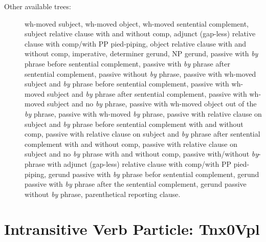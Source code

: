 \begin{description}
\item[Other available trees:] wh-moved subject, wh-moved object, wh-moved 
sentential complement, subject relative clause with and without comp, 
adjunct (gap-less) relative clause with comp/with PP pied-piping, 
object relative clause with and without comp, 
imperative, determiner gerund, NP gerund, passive with {\it by} phrase 
before sentential complement, passive with {\it by} phrase after sentential 
complement, passive without {\it by} phrase, passive with wh-moved subject 
and {\it by} phrase before sentential complement, passive with wh-moved 
subject and {\it by} phrase after sentential complement, passive with 
wh-moved subject and no {\it by} phrase, passive with wh-moved object out 
of the {\it by} phrase, passive with wh-moved {\it by} phrase, passive with 
relative clause on subject and {\it by} phrase before sentential 
complement with and without comp, passive with relative clause on subject and {\it by} phrase 
after sentential complement with and without comp, 
passive with relative clause on subject and no {\it by} phrase with and without comp, 
passive with/without {\it by}-phrase with adjunct (gap-less) relative clause 
with comp/with PP pied-piping, gerund passive with {\it by} phrase befor sentential 
complement, gerund passive with {\it by} phrase after the sentential 
complement, gerund passive without {\it by} phrase, parenthetical 
reporting clause. 
 
\end{description} 
 
 
 
\section{Intransitive Verb Particle: Tnx0Vpl} 
\label{nx0Vpl} 
 
